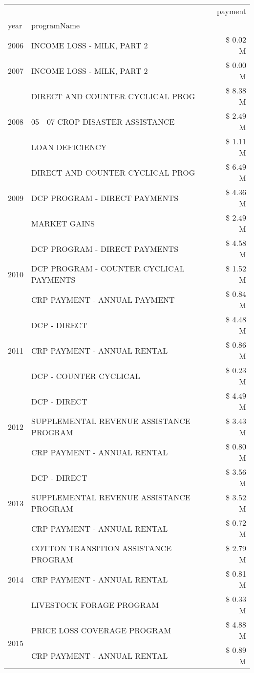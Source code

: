 \begin{tabular}{llr}
\toprule
 &  & payment \\
year & programName &  \\
\midrule
2006 & INCOME LOSS - MILK, PART 2 & \$ 0.02 M \\
\cline{1-3}
2007 & INCOME LOSS - MILK, PART 2 & \$ 0.00 M \\
\cline{1-3}
\multirow[t]{3}{*}{2008} & DIRECT AND COUNTER CYCLICAL PROG & \$ 8.38 M \\
 & 05 - 07 CROP DISASTER ASSISTANCE & \$ 2.49 M \\
 & LOAN DEFICIENCY & \$ 1.11 M \\
\cline{1-3}
\multirow[t]{3}{*}{2009} & DIRECT AND COUNTER CYCLICAL PROG & \$ 6.49 M \\
 & DCP PROGRAM - DIRECT PAYMENTS & \$ 4.36 M \\
 & MARKET GAINS & \$ 2.49 M \\
\cline{1-3}
\multirow[t]{3}{*}{2010} & DCP PROGRAM - DIRECT PAYMENTS & \$ 4.58 M \\
 & DCP PROGRAM - COUNTER CYCLICAL PAYMENTS & \$ 1.52 M \\
 & CRP PAYMENT - ANNUAL PAYMENT & \$ 0.84 M \\
\cline{1-3}
\multirow[t]{3}{*}{2011} & DCP - DIRECT & \$ 4.48 M \\
 & CRP PAYMENT - ANNUAL RENTAL & \$ 0.86 M \\
 & DCP - COUNTER CYCLICAL & \$ 0.23 M \\
\cline{1-3}
\multirow[t]{3}{*}{2012} & DCP - DIRECT & \$ 4.49 M \\
 & SUPPLEMENTAL REVENUE ASSISTANCE PROGRAM & \$ 3.43 M \\
 & CRP PAYMENT - ANNUAL RENTAL & \$ 0.80 M \\
\cline{1-3}
\multirow[t]{3}{*}{2013} & DCP - DIRECT & \$ 3.56 M \\
 & SUPPLEMENTAL REVENUE ASSISTANCE PROGRAM & \$ 3.52 M \\
 & CRP PAYMENT - ANNUAL RENTAL & \$ 0.72 M \\
\cline{1-3}
\multirow[t]{3}{*}{2014} & COTTON TRANSITION ASSISTANCE PROGRAM & \$ 2.79 M \\
 & CRP PAYMENT - ANNUAL RENTAL & \$ 0.81 M \\
 & LIVESTOCK FORAGE PROGRAM & \$ 0.33 M \\
\cline{1-3}
\multirow[t]{3}{*}{2015} & PRICE LOSS COVERAGE PROGRAM & \$ 4.88 M \\
 & CRP PAYMENT - ANNUAL RENTAL & \$ 0.89 M \\

\end{tabular}

